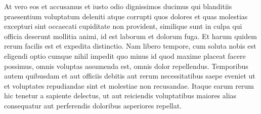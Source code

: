 At vero eos et accusamus et iusto odio dignissimos ducimus qui blanditiis praesentium voluptatum deleniti atque corrupti quos dolores et quas molestias excepturi sint occaecati cupiditate non provident, similique sunt in culpa qui officia deserunt mollitia animi, id est laborum et dolorum fuga. Et harum quidem rerum facilis est et expedita distinctio. Nam libero tempore, cum soluta nobis est eligendi optio cumque nihil impedit quo minus id quod maxime placeat facere possimus, omnis voluptas assumenda est, omnis dolor repellendus. Temporibus autem quibusdam et aut officiis debitis aut rerum necessitatibus saepe eveniet ut et voluptates repudiandae sint et molestiae non recusandae. Itaque earum rerum hic tenetur a sapiente delectus, ut aut reiciendis voluptatibus maiores alias consequatur aut perferendis doloribus asperiores repellat.

